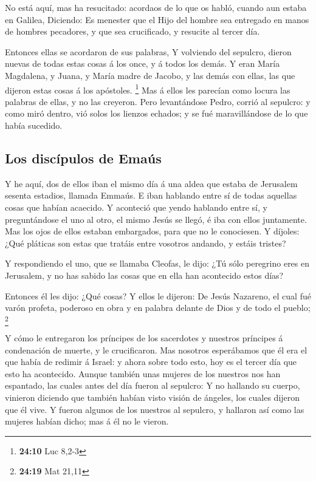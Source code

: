  No está aquí, mas ha resucitado: acordaos de lo que os
habló, cuando aun estaba en Galilea,  Diciendo: Es menester
que el Hijo del hombre sea entregado en manos de hombres pecadores, y
que sea crucificado, y resucite al tercer día.

 Entonces ellas se acordaron de sus palabras,  Y
volviendo del sepulcro, dieron nuevas de todas estas cosas á los once, y
á todos los demás.  Y eran María Magdalena, y Juana, y
María madre de Jacobo, y las demás con ellas, las que dijeron estas
cosas á los apóstoles. \footnote{\textbf{24:10} Luc 8,2-3} 
Mas á ellos les parecían como locura las palabras de ellas, y no las
creyeron.  Pero levantándose Pedro, corrió al sepulcro: y
como miró dentro, vió solos los lienzos echados; y se fué maravillándose
de lo que había sucedido.

\hypertarget{los-discuxedpulos-de-emauxfas}{%
\subsection{Los discípulos de
Emaús}\label{los-discuxedpulos-de-emauxfas}}

 Y he aquí, dos de ellos iban el mismo día á una aldea que
estaba de Jerusalem sesenta estadios, llamada Emmaús.  E
iban hablando entre sí de todas aquellas cosas que habían acaecido.
 Y aconteció que yendo hablando entre sí, y preguntándose
el uno al otro, el mismo Jesús se llegó, é iba con ellos juntamente.
 Mas los ojos de ellos estaban embargados, para que no le
conociesen.  Y díjoles: ¿Qué pláticas son estas que tratáis
entre vosotros andando, y estáis tristes?

 Y respondiendo el uno, que se llamaba Cleofas, le dijo:
¿Tú sólo peregrino eres en Jerusalem, y no has sabido las cosas que en
ella han acontecido estos días?

 Entonces él les dijo: ¿Qué cosas? Y ellos le dijeron: De
Jesús Nazareno, el cual fué varón profeta, poderoso en obra y en palabra
delante de Dios y de todo el pueblo; \footnote{\textbf{24:19} Mat 21,11}

 Y cómo le entregaron los príncipes de los sacerdotes y
nuestros príncipes á condenación de muerte, y le crucificaron.
 Mas nosotros esperábamos que él era el que había de
redimir á Israel: y ahora sobre todo esto, hoy es el tercer día que esto
ha acontecido.  Aunque también unas mujeres de los nuestros
nos han espantado, las cuales antes del día fueron al sepulcro:
 Y no hallando su cuerpo, vinieron diciendo que también
habían visto visión de ángeles, los cuales dijeron que él vive.
 Y fueron algunos de los nuestros al sepulcro, y hallaron
así como las mujeres habían dicho; mas á él no le vieron.

